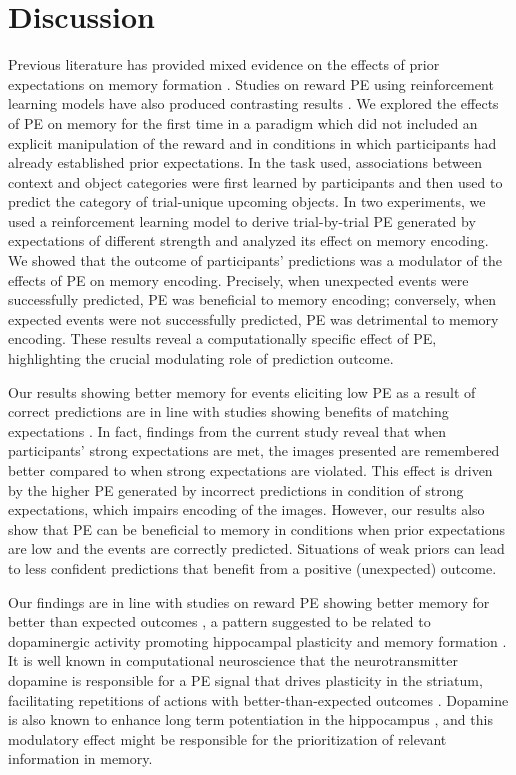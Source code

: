 \documentclass[a4paper,12pt]{article}
\begin{document}
\section{Discussion}
Previous literature has provided mixed evidence on the effects of prior expectations on memory formation \citep{Bein2015, BrodGarvinShingYee2019, Greve2017, Kafkas2018}. Studies on reward PE using reinforcement learning models have also produced contrasting results \citep{Jang2019, de2018signed,Rouhani2018, Rouhani2021}. We explored the effects of PE on memory for the first time in a paradigm which did not included an explicit manipulation of the reward and in conditions in which participants had already established prior expectations. In the task used, associations between context and object categories were first learned by participants and then used to predict the category of trial-unique upcoming objects. In two experiments, we used a reinforcement learning model to derive trial-by-trial PE generated by expectations of different strength and analyzed its effect on memory encoding. We showed that the outcome of participants' predictions was a modulator of the effects of PE on memory encoding. Precisely, when unexpected events were successfully predicted, PE was beneficial to memory encoding; conversely, when expected events were not successfully predicted, PE was detrimental to memory encoding. These results reveal a computationally specific effect of PE, highlighting the crucial modulating role of prediction outcome. \par
Our results showing better memory for events eliciting low PE as a result of correct predictions are in line with studies showing benefits of matching expectations \citep{Bein2015, BrodGarvinShingYee2019, VanKesteren2013}⁠. In fact, findings from the current study reveal that when participants' strong expectations are met, the images presented are remembered better compared to when strong expectations are violated. This effect is driven by the higher PE generated by incorrect predictions in condition of strong expectations, which impairs encoding of the images. However, our results also show that PE can be beneficial to memory in conditions when prior expectations are low and the events are correctly predicted. Situations of weak priors can lead to less confident predictions that benefit from a positive (unexpected) outcome. \par
Our findings are in line with studies on reward PE showing better memory for better than expected outcomes \citep{de2018signed, Jang2019},
a pattern suggested to be related to dopaminergic activity promoting hippocampal plasticity and memory formation \citep{Bethus2010,rosen2015midbrain}. It is well known in computational neuroscience that the neurotransmitter dopamine is responsible for a PE signal that drives plasticity in the striatum, facilitating repetitions of actions with better-than-expected outcomes \citep{Daw2013, Niv2008}. Dopamine is also known to enhance long term potentiation in the hippocampus \citep{lemon2006dopamine}, and this modulatory effect might be responsible for the prioritization of relevant information in memory. \par 
\end{document}
